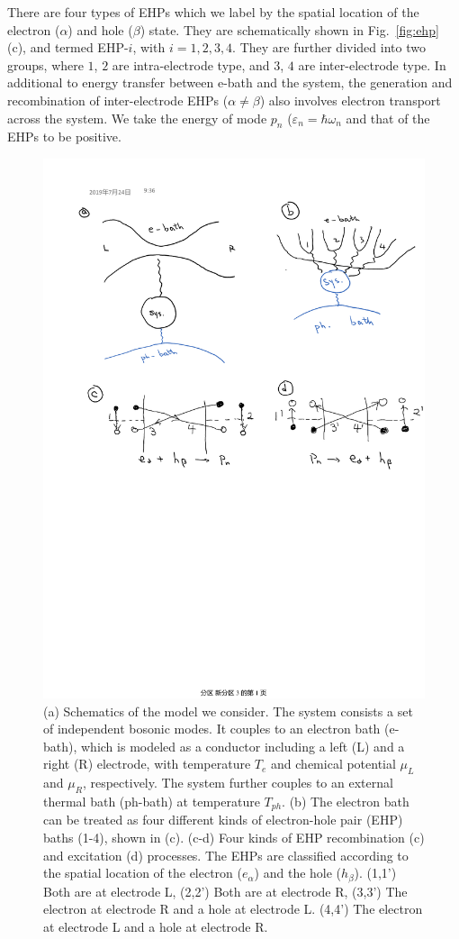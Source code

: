 \documentclass[aps
,floatfix,footinbib,
preprint
]{revtex4-1}
\begin{document}
There are four types of EHPs which we label by the spatial location of the electron ($\alpha$) and hole  ($\beta$) state. They are schematically shown in Fig.~\ref{fig:ehp} (c), and termed EHP-$i$, with $i=1,2,3,4$. They are further divided into two groups, where $1$, $2$ are intra-electrode type, and $3$, $4$ are inter-electrode type. In additional to energy transfer between e-bath and the system, the generation and recombination of inter-electrode EHPs ($\alpha\neq \beta$) also involves electron transport across the system. We take the energy of mode $p_n$ ($\varepsilon_n=\hbar\omega_n$ and that of the EHPs to be positive. 

\begin{figure}
	\includegraphics[scale=0.75,angle=0]{schematics-v2.pdf}
	\caption{(a) Schematics of the model we consider. The system consists a set of independent bosonic modes. It couples to an electron bath (e-bath), which is modeled as a conductor including a left (L) and a right (R) electrode, with temperature $T_e$ and chemical potential $\mu_L$ and $\mu_R$, respectively. The system further couples to an external thermal bath (ph-bath) at temperature $T_{ph}$. (b) The electron bath can be treated as four different kinds of electron-hole pair (EHP) baths (1-4), shown in (c). (c-d) Four kinds of EHP recombination (c) and excitation (d) processes. The EHPs are classified according to the spatial location of the electron ($e_\alpha$) and the hole ($h_\beta$). (1,1') Both are at electrode L, (2,2') Both are at electrode R, (3,3') The electron at electrode R and a hole at electrode L. (4,4') The electron at electrode L and a hole at electrode R.}

\end{figure}
\end{document}
